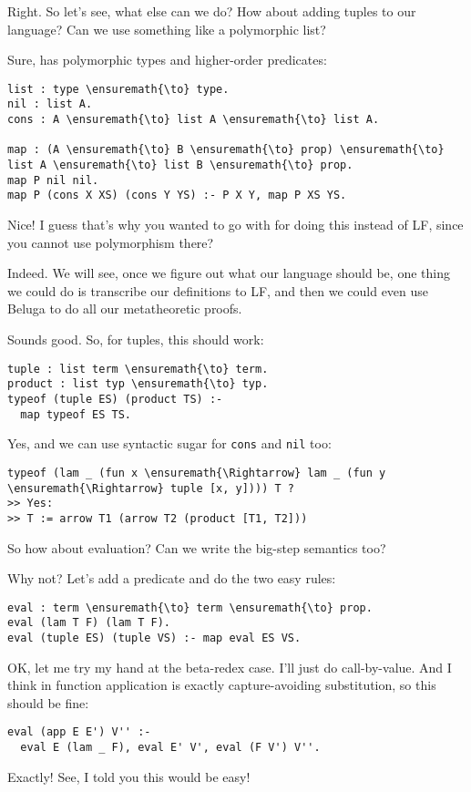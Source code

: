  Right. So let's see, what else can we do? How about adding tuples
to our language? Can we use something like a polymorphic list?

 Sure, \lamprolog has polymorphic types and higher-order
predicates:

\begin{verbatim}
list : type \ensuremath{\to} type.
nil : list A.
cons : A \ensuremath{\to} list A \ensuremath{\to} list A.

map : (A \ensuremath{\to} B \ensuremath{\to} prop) \ensuremath{\to} list A \ensuremath{\to} list B \ensuremath{\to} prop.
map P nil nil.
map P (cons X XS) (cons Y YS) :- P X Y, map P XS YS.
\end{verbatim}

 Nice! I guess that's why you wanted to go with \lamprolog for
doing this instead of LF, since you cannot use polymorphism there?

 Indeed. We will see, once we figure out what our language should
be, one thing we could do is transcribe our definitions to LF, and then
we could even use Beluga \citep{pientka2008programming} to do all our
metatheoretic proofs.

 Sounds good. So, for tuples, this should work:

\begin{verbatim}
tuple : list term \ensuremath{\to} term.
product : list typ \ensuremath{\to} typ.
typeof (tuple ES) (product TS) :-
  map typeof ES TS.
\end{verbatim}

 Yes, and we can use syntactic sugar for \texttt{cons} and
\texttt{nil} too:

\begin{verbatim}
typeof (lam _ (fun x \ensuremath{\Rightarrow} lam _ (fun y \ensuremath{\Rightarrow} tuple [x, y]))) T ?
>> Yes:
>> T := arrow T1 (arrow T2 (product [T1, T2]))
\end{verbatim}

 So how about evaluation? Can we write the big-step semantics too?

 Why not? Let's add a predicate and do the two easy rules:

\begin{verbatim}
eval : term \ensuremath{\to} term \ensuremath{\to} prop.
eval (lam T F) (lam T F).
eval (tuple ES) (tuple VS) :- map eval ES VS.
\end{verbatim}

 OK, let me try my hand at the beta-redex case. I'll just do
call-by-value. And I think in \lamprolog function application is exactly
capture-avoiding substitution, so this should be fine:

\begin{verbatim}
eval (app E E') V'' :-
  eval E (lam _ F), eval E' V', eval (F V') V''.
\end{verbatim}

 Exactly! See, I told you this would be easy!
